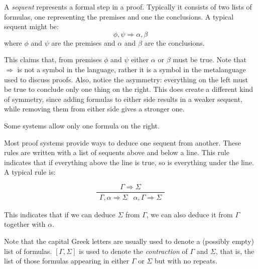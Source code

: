 \documentclass[12pt]{article}
\begin{document}
A \emph{sequent} represents a formal step in a proof.  Typically it consists of two lists of formulas, one representing the premises and one the conclusions.  A typical sequent might be:
$$\phi,\psi\Rightarrow\alpha,\beta$$
where $\phi$ and $\psi$ are the premises and $\alpha$ and $\beta$ are the conclusions.

This claims that, from premises $\phi$ and $\psi$ either $\alpha$ or $\beta$ must be true.  Note that $\Rightarrow$ is not a symbol in the language, rather it is a symbol in the metalanguage used to discuss proofs.  Also, notice the asymmetry: everything on the left must be true to conclude only one thing on the right.  This does create a different kind of symmetry, since adding formulas to either side results in a weaker sequent, while removing them from either side gives a stronger one.

Some systems allow only one formula on the right.

Most proof systems provide ways to deduce one sequent from another.  These rules are written with a list of sequents above and below a line.  This rule indicates that if everything above the line is true, so is everything under the line.  A typical rule is:

$$\frac{\Gamma\Rightarrow\Sigma}{\begin{array}{cc}
\Gamma,\alpha\Rightarrow\Sigma &
\alpha,\Gamma\Rightarrow\Sigma
\end{array}}$$

This indicates that if we can deduce $\Sigma$ from $\Gamma$, we can also deduce it from $\Gamma$ together with $\alpha$.

Note that the capital Greek letters are usually used to denote a (possibly empty) list of formulas.  $[\Gamma,\Sigma]$ is used to denote the \emph{contraction} of $\Gamma$ and $\Sigma$, that is, the list of those formulas appearing in either $\Gamma$ or $\Sigma$ but with no repeats.
\end{document}
